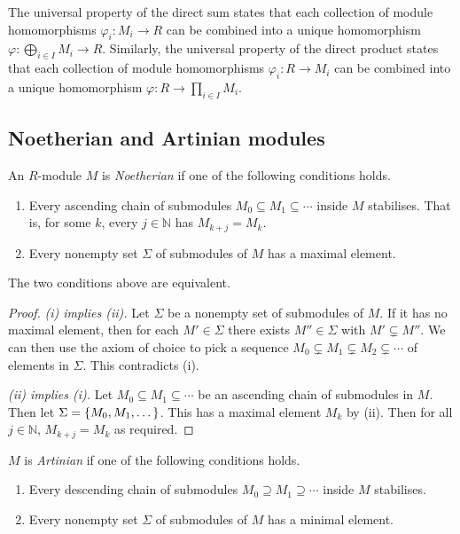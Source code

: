 The universal property of the direct sum states that each collection of module homomorphisms \( \varphi_i : M_i \to R \) can be combined into a unique homomorphism \( \varphi : \bigoplus_{i \in I} M_i \to R \).
Similarly, the universal property of the direct product states that each collection of module homomorphisms \( \varphi_i : R \to M_i \) can be combined into a unique homomorphism \( \varphi : R \to \prod_{i \in I} M_i \).

\subsection{Noetherian and Artinian modules}
\begin{definition}
    An \( R \)-module \( M \) is \emph{Noetherian} if one of the following conditions holds.
    \begin{enumerate}
        \item Every ascending chain of submodules \( M_0 \subseteq M_1 \subseteq \cdots \) inside \( M \) stabilises.
        That is, for some \( k \), every \( j \in \mathbb N \) has \( M_{k+j} = M_k \).
        \item Every nonempty set \( \Sigma \) of submodules of \( M \) has a maximal element.
    \end{enumerate}
\end{definition}
\begin{lemma}
    The two conditions above are equivalent.
\end{lemma}
\begin{proof}
    \emph{(i) implies (ii).}
    Let \( \Sigma \) be a nonempty set of submodules of \( M \).
    If it has no maximal element, then for each \( M' \in \Sigma \) there exists \( M'' \in \Sigma \) with \( M' \subsetneq M'' \).
    We can then use the axiom of choice to pick a sequence \( M_0 \subsetneq M_1 \subsetneq M_2 \subsetneq \cdots \) of elements in \( \Sigma \).
    This contradicts (i).

    \emph{(ii) implies (i).}
    Let \( M_0 \subseteq M_1 \subseteq \cdots \) be an ascending chain of submodules in \( M \).
    Then let \( \Sigma = \qty{M_0, M_1, \dots} \).
    This has a maximal element \( M_k \) by (ii).
    Then for all \( j \in \mathbb N \), \( M_{k+j} = M_k \) as required.
\end{proof}
\begin{definition}
    \( M \) is \emph{Artinian} if one of the following conditions holds.
    \begin{enumerate}
        \item Every descending chain of submodules \( M_0 \supseteq M_1 \supseteq \cdots \) inside \( M \) stabilises.
        \item Every nonempty set \( \Sigma \) of submodules of \( M \) has a minimal element.
    \end{enumerate}
\end{definition}
